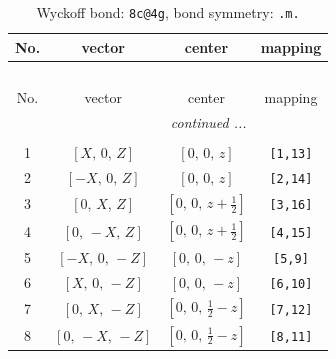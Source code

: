 \documentclass[fleqn,8pt]{jsarticle}
\begin{document}
\begin{longtable}{cccc}
\caption{Wyckoff bond: {\tt 8c@4g}, bond symmetry: {\tt .m.}}
 \\
 \hline \hline
No. & vector & center & mapping \\ \hline \endfirsthead

\multicolumn{3}{l}{\tablename\ \thetable{}} \\
 \hline \hline
No. & vector & center & mapping \\ \hline \endhead

 \hline \hline
\multicolumn{3}{r}{\footnotesize\it continued ...} \\ \endfoot

 \hline \hline
\multicolumn{3}{r}{} \\ \endlastfoot

1 & $\left[ X,\, 0,\, Z \right]$ & $\left[ 0,\, 0,\, z \right]$ & {\tt [1,13]} \\ \hline
2 & $\left[ - X,\, 0,\, Z \right]$ & $\left[ 0,\, 0,\, z \right]$ & {\tt [2,14]} \\ \hline
3 & $\left[ 0,\, X,\, Z \right]$ & $\left[ 0,\, 0,\, z + \frac{1}{2} \right]$ & {\tt [3,16]} \\ \hline
4 & $\left[ 0,\, - X,\, Z \right]$ & $\left[ 0,\, 0,\, z + \frac{1}{2} \right]$ & {\tt [4,15]} \\ \hline
5 & $\left[ - X,\, 0,\, - Z \right]$ & $\left[ 0,\, 0,\, - z \right]$ & {\tt [5,9]} \\ \hline
6 & $\left[ X,\, 0,\, - Z \right]$ & $\left[ 0,\, 0,\, - z \right]$ & {\tt [6,10]} \\ \hline
7 & $\left[ 0,\, X,\, - Z \right]$ & $\left[ 0,\, 0,\, \frac{1}{2} - z \right]$ & {\tt [7,12]} \\ \hline
8 & $\left[ 0,\, - X,\, - Z \right]$ & $\left[ 0,\, 0,\, \frac{1}{2} - z \right]$ & {\tt [8,11]} \\
\end{longtable}
\renewcommand{\arraystretch}{1.2}
\end{document}
